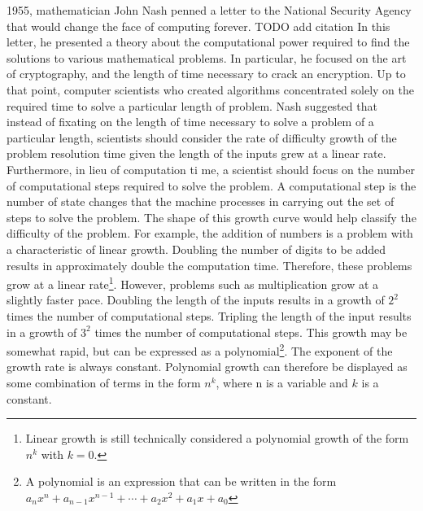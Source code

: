 \documentclass[10pt,journal,compsoc]{IEEEtran}
\begin{document}
% 
% 
% 
% 
 1955, mathematician John Nash penned a letter to the National Security Agency that would change the face of computing forever. TODO add citation
In this letter, he presented a theory about the computational power required to find the solutions to various mathematical problems. In particular, he focused on the art of cryptography, and the length of time necessary to crack an encryption. Up to that point, computer scientists who created algorithms concentrated solely on the required time to solve a particular length of problem. Nash suggested that instead of fixating on the length of time necessary to solve a problem of a particular length, scientists should consider the rate of difficulty growth of the problem resolution time given the length of the inputs grew at a linear rate. Furthermore, in lieu of computation ti me, a scientist should focus on the number of computational steps required to solve the problem. A computational step is the number of state changes that the machine processes  in carrying out the set of steps to solve the problem. The shape of this growth curve would help classify the difficulty of the problem. For example, the addition of numbers is a problem with a characteristic of linear growth. Doubling the number of digits to be added results in approximately double the computation time. Therefore, these problems grow at a linear rate\footnote{Linear growth is still technically considered a polynomial growth of the form $n^k$ with $k=0$.}.  However, problems such as multiplication grow at a slightly faster pace. Doubling the length of the inputs results in a growth of $2^2$ times the number of computational steps. Tripling the length of the input  results in a growth of $3^2$ times the number of computational steps. This growth may be somewhat rapid, but can be expressed as a polynomial\footnote{A polynomial is an expression that can be written in the form $a_{n}x^{n}+a_{n-1}x^{n-1}+\dotsb +a_{2}x^{2}+a_{1}x+a_{0}$ }. The exponent of the growth rate is always constant. Polynomial growth can therefore be displayed as some combination of terms in the form $n^k$, where n is a variable and $k$ is a constant.
\end{document}
